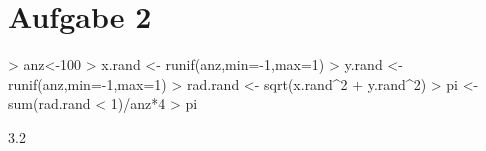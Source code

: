 

\section{Aufgabe 2}
\begin{Schunk}
\begin{Sinput}
> anz<-100
> x.rand <- runif(anz,min=-1,max=1)
> y.rand <- runif(anz,min=-1,max=1)
> rad.rand <- sqrt(x.rand^2 + y.rand^2)
> pi <- sum(rad.rand < 1)/anz*4
> pi
\end{Sinput}
\begin{Soutput}
[1] 3.2
\end{Soutput}
\end{Schunk}
